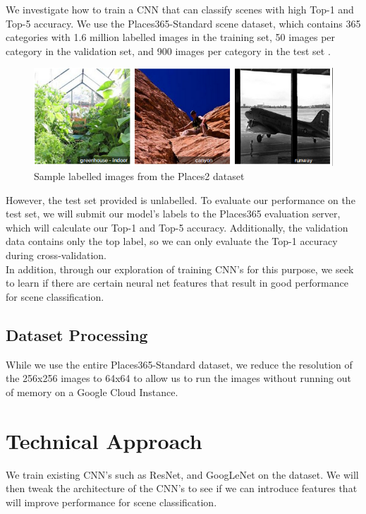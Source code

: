 \documentclass[10pt,twocolumn,letterpaper]{article}
\begin{document}
We investigate how to train a CNN that can classify scenes with high Top-1
and Top-5 accuracy. We use the Places365-Standard scene dataset, which contains
365 categories with 1.6 million labelled images in the training set, 50 images
per category in the validation set, and 900 images per category in the test set
\cite{Zhou}.\\

\begin{figure}[h]
\begin{center}
  \includegraphics[width=0.8\linewidth]{places2db-cropped.png}
\end{center}
   \caption{Sample labelled images from the Places2 dataset}
\label{figure:sample-images}
\end{figure}


However, the test set provided is unlabelled. To evaluate our performance on
the test set, we will submit our model's labels to the Places365 evaluation
server, which will calculate our Top-1 and Top-5 accuracy. Additionally, the
validation data contains only the top label, so we can only evaluate the Top-1
accuracy during cross-validation.\\

In addition, through our exploration of training CNN's for this purpose, we
seek to learn if there are certain neural net features that result in good
performance for scene classification.\\

\subsection{Dataset Processing}
While we use the entire Places365-Standard dataset, we reduce the resolution of
the 256x256 images to 64x64 to allow us to run the images without running out of
memory on a Google Cloud Instance.\\

\section{Technical Approach}
We train existing CNN's such as ResNet\cite{ResNet}, and GoogLeNet on the
dataset. We will then tweak the architecture of the CNN's to see if we can
introduce features that will improve performance for scene classification. \\
\end{document}
